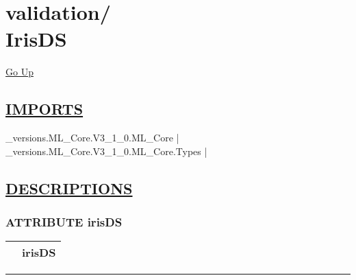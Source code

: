 \chapter*{\color{headfile}
{\large validation\slash\hspace{0pt}}
 \\
IrisDS
}
\hypertarget{ecldoc:toc:validation.IrisDS}{}
\hyperlink{ecldoc:toc:root/validation}{Go Up}

\section*{\underline{\textsf{IMPORTS}}}
\begin{doublespace}
{\large
\_versions.ML\_Core.V3\_1\_0.ML\_Core |
\_versions.ML\_Core.V3\_1\_0.ML\_Core.Types |
}
\end{doublespace}

\section*{\underline{\textsf{DESCRIPTIONS}}}
\subsection*{\textsf{\colorbox{headtoc}{\color{white} ATTRIBUTE}
irisDS}}

\hypertarget{ecldoc:validation.irisds}{}

{\renewcommand{\arraystretch}{1.5}
\begin{tabularx}{\textwidth}{|>{\raggedright\arraybackslash}l|X|}
\hline
\hspace{0pt}\mytexttt{\color{red} } & \textbf{irisDS} \\
\hline
\end{tabularx}
}

\par


\rule{\linewidth}{0.5pt}
